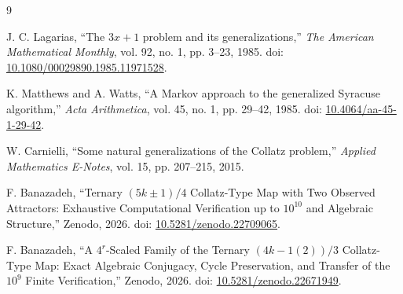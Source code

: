 \documentclass[11pt]{article}
\theoremstyle{remark}
\begin{document}
\begin{thebibliography}{9}

J. C. Lagarias,
``The $3x+1$ problem and its generalizations,''
\emph{The American Mathematical Monthly}, vol. 92, no. 1, pp. 3--23, 1985.
doi: \href{https://doi.org/10.1080/00029890.1985.11971528}{10.1080/00029890.1985.11971528}.

K. Matthews and A. Watts,
``A Markov approach to the generalized Syracuse algorithm,''
\emph{Acta Arithmetica}, vol. 45, no. 1, pp. 29--42, 1985.
doi: \href{https://doi.org/10.4064/aa-45-1-29-42}{10.4064/aa-45-1-29-42}.

W. Carnielli,
``Some natural generalizations of the Collatz problem,''
\emph{Applied Mathematics E-Notes}, vol. 15, pp. 207--215, 2015.

F. Banazadeh,
``Ternary $(5k\pm1)/4$ Collatz-Type Map with Two Observed Attractors:
Exhaustive Computational Verification up to $10^{10}$ and Algebraic Structure,''
Zenodo, 2026. doi: \href{https://doi.org/10.5281/zenodo.22709065}{10.5281/zenodo.22709065}.

F. Banazadeh,
``A $4^r$-Scaled Family of the Ternary $(4k-1(2))/3$ Collatz-Type Map:
Exact Algebraic Conjugacy, Cycle Preservation, and Transfer of the $10^9$ Finite Verification,''
Zenodo, 2026. doi: \href{https://doi.org/10.5281/zenodo.22671949}{10.5281/zenodo.22671949}.

\end{thebibliography}
\end{document}
